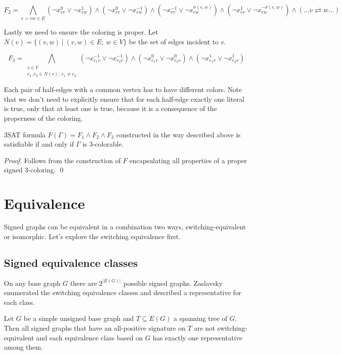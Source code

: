 $$F_2 = \bigwedge _{e = vw \in E} (\neg x^{0}_{ev} \vee \neg x^{1}_{ew}) \wedge (\neg x^{0}_{ev} \vee \neg x^{-1}_{ew}) \wedge (\neg x^{-1}_{ev} \lor \neg x^{\sigma (e, w)}_{ew}) \land (\neg x^{1}_{ev} \lor \neg x^{-\sigma (e, w)}_{ew}) \wedge (\dots v \rightleftarrows w \dots) $$

Lastly we need to ensure the coloring is proper. Let $N(v) = \{(v, w) ~|~ (v,w) \in E; ~ w \in V \}$ be the set of edges incident to $v$.

$$F_3 = \bigwedge _{\substack{v \in V \\ e_1, e_2 \in N(v); ~ e_1 \neq e_2}} (\neg x^{-1}_{e_1v} \lor \neg x^{-1}_{e_2v}) \land (\neg x^{0}_{e_1v} \lor \neg x^{0}_{e_2v}) \land (\neg x^{1}_{e_1v} \lor \neg x^{1}_{e_2v}) $$

Each pair of half-edges with a common vertex has to have different colors. Note that we don't need to explicitly ensure that for each half-edge exactly one literal is true, only that at least one is true, because it is a consequence of the properness of the coloring.

\begin{theorem}
    3SAT formula $F(\Gamma) = F_1 \wedge F_2 \wedge F_3$ constructed in the way described above is satisfiable if and only if $\Gamma$ is 3-colorable.
\end{theorem}

\textit{Proof.} Follows from the construction of $F$ encapsulating all properties of a proper signed 3-coloring. \qed

\section{Equivalence}

Signed graphs can be equivalent in a combination two ways, switching-equivalent or isomorphic. Let's explore the switching equivalence first.

\subsection{Signed equivalence classes}

On any base graph $G$ there are $2^{|E(G)|}$ possible signed graphs. Zaslavsky enumerated the switching equivalence classes and described a representative for each class.

\begin{lemma}\label{lem1:eq-classes}
    Let $G$ be a simple unsigned base graph and $T \subseteq E(G)$ a spanning tree of $G$. Then all signed graphs that have an all-positive signature on $T$ are not switching-equivalent and each equivalence class based on $G$ has exactly one representative among them.
\end{lemma}

